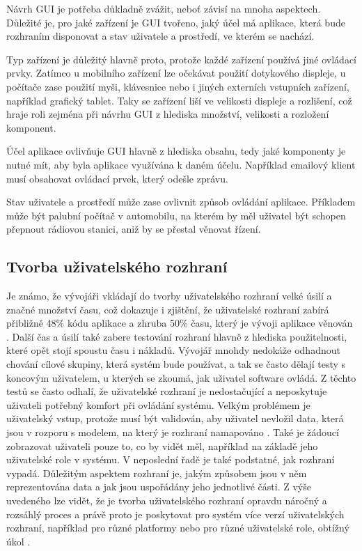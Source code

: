 Návrh GUI je potřeba důkladně zvážit, neboť závisí na mnoha aspektech. Důležité je, pro jaké zařízení je GUI tvořeno, jaký účel má aplikace, která bude rozhraním disponovat a stav uživatele a prostředí, ve kterém se nachází. 

Typ zařízení je důležitý hlavně proto, protože každé zařízení používá jiné ovládací prvky. Zatímco u mobilního zařízení lze očekávat použití dotykového displeje, u počítače zase použití myši, klávesnice nebo i jiných externích vstupních zařízení, například grafický tablet. Taky se zařízení liší ve velikosti displeje a rozlišení, což hraje roli zejména při návrhu GUI z hlediska množství, velikosti a rozložení komponent.

Účel aplikace ovlivňuje GUI hlavně z hlediska obsahu, tedy jaké komponenty je nutné mít, aby byla aplikace využívána k daném účelu. Například emailový klient musí obsahovat ovládací prvek, který odešle zprávu. 

Stav uživatele a prostředí může zase ovlivnit způsob ovládání aplikace. Příkladem může být palubní počítač v automobilu, na kterém by měl uživatel být schopen přepnout rádiovou stanici, aniž by se přestal věnovat řízení. 


\subsection{Tvorba uživatelského rozhraní}

Je známo, že vývojáři vkládají do tvorby uživatelského rozhraní velké úsilí a značné množství času, což dokazuje i zjištění, že uživatelské rozhraní zabírá přibližně 48\% kódu aplikace a zhruba 50\% času, který je vývoji aplikace věnován \cite{towards-smart-design}. Další čas a úsilí také zabere testování rozhraní hlavně z hlediska použitelnosti, které opět stojí spoustu času i nákladů. Vývojář mnohdy nedokáže odhadnout chování cílové skupiny, která systém bude používat, a tak se často dělají testy s koncovým uživatelem, u kterých se zkoumá, jak uživatel software ovládá. Z těchto testů se často odhalí, že uživatelské rozhraní je nedostačující a neposkytuje uživateli potřebný komfort při ovládání systému. Velkým problémem je uživatelský vstup, protože musí být validován, aby uživatel nevložil data, která jsou v rozporu s modelem, na který je rozhraní namapováno \cite{cernyTEA}. Také je žádoucí zobrazovat uživateli pouze to, co by vidět měl, například na základě jeho uživatelské role v systému. V neposlední řadě je také podstatné, jak rozhraní vypadá. Důležitým aspektem rozhraní je, jakým způsobem jsou v něm reprezentována data a jak jsou uspořádány jeho jednotlivé části. Z výše uvedeného lze vidět, že je tvorba uživatelského rozhraní opravdu náročný a rozsáhlý proces a právě proto je poskytovat pro systém více verzí uživatelských rozhraní, například pro různé platformy nebo pro různé uživatelské role, obtížný úkol \cite{cernyTEA}.

